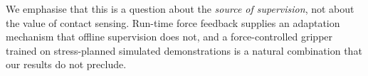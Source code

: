 \noindent We emphasise that this is a question about the \emph{source of supervision}, not
about the value of contact sensing. Run-time force feedback supplies an adaptation mechanism
that offline supervision does not, and a force-controlled gripper trained on stress-planned
simulated demonstrations is a natural combination that our results do not preclude.
